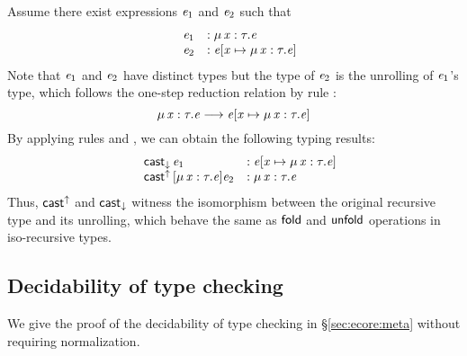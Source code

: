 Assume there exist expressions $\mathit{e_{{\mathrm{1}}}}$ and $\mathit{e_{{\mathrm{2}}}}$ such that 
\[\begin{array}{lll}
	&\mathit{e_{{\mathrm{1}}}} &: \mu \, \mathit{x}  :  \tau  .  \mathit{e}\\
	&\mathit{e_{{\mathrm{2}}}} &: \mathit{e}  [  \mathit{x}  \mapsto  \mu \, \mathit{x}  :  \tau  .  \mathit{e}  ]
\end{array}\]
Note that $\mathit{e_{{\mathrm{1}}}}$ and $\mathit{e_{{\mathrm{2}}}}$ have distinct types but the type of $\mathit{e_{{\mathrm{2}}}}$ is the unrolling of $\mathit{e_{{\mathrm{1}}}}$'s type, which follows the one-step reduction relation by rule :
\[ \mu \, \mathit{x}  :  \tau  .  \mathit{e}  \longrightarrow  \mathit{e}  [  \mathit{x}  \mapsto  \mu \, \mathit{x}  :  \tau  .  \mathit{e}  ] \]
By applying rules  and , we can obtain the following typing results:
\[\begin{array}{lll}
	&\mathsf{cast}_{\downarrow} \, \mathit{e_{{\mathrm{1}}}} &: \mathit{e}  [  \mathit{x}  \mapsto  \mu \, \mathit{x}  :  \tau  .  \mathit{e}  ]\\
	&\mathsf{cast}^{\uparrow} \, [  \mu \, \mathit{x}  :  \tau  .  \mathit{e}  ]  \mathit{e_{{\mathrm{2}}}} &: \mu \, \mathit{x}  :  \tau  .  \mathit{e}
\end{array}\]
Thus, $ \mathsf{cast}^{\uparrow} $ and $ \mathsf{cast}_{\downarrow} $ witness the isomorphism between the original recursive type and its unrolling, which behave the same as $\mathsf{fold}$ and $\mathsf{unfold}$ operations in iso-recursive types.

\subsection{Decidability of type checking}
We give the proof of the decidability of type checking \ecore in \S \ref{sec:ecore:meta} without requiring normalization. 


